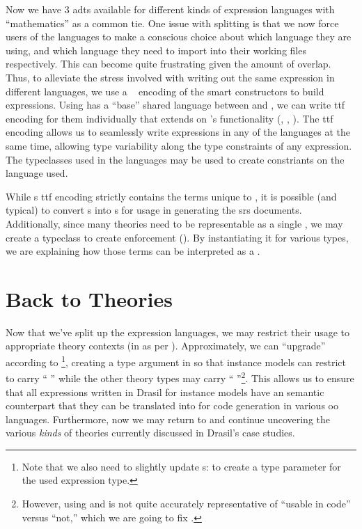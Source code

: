 Now we have 3 \acsp{adt} available for different kinds of expression languages
with ``mathematics'' as a common tie. One issue with splitting is that we now
force users of the languages to make a conscious choice about which language
they are using, and which language they need to import into their working files
respectively. This can become quite frustrating given the amount of overlap.
Thus, to alleviate the stress involved with writing out the same expression in
different languages, we use a ~\cite{Carette2009} encoding of the smart
constructors to build expressions. Using \Expr{} has a ``base'' shared language
between \ModelExpr{} and \CodeExpr{}, we can write \acs{ttf} encoding for them
individually that extends on \Expr{}'s functionality
(, ,
). The \acs{ttf} encoding allows us to seamlessly
write expressions in any of the languages at the same time, allowing type
variability along the type constraints of any expression. The typeclasses used
in the languages may be used to create constriants on the language used.

While \ModelExpr{}s \acs{ttf} encoding strictly contains the terms unique to
\ModelExpr{}, it is possible (and typical) to convert \Expr{}s into
\ModelExpr{}s for usage in generating the \acs{srs} documents. Additionally,
since many theories need to be representable as a single \Relation{}, we may
create a typeclass to create enforcement (). By
instantiating it for various types, we are explaining how those terms can be
interpreted as a \ModelExpr{}.

\currentExpressHaskell{}
 
\section{Back to Theories}
\label{chap:lang-division:sec:back-to-theories}

Now that we've split up the expression languages, we may restrict their usage to
appropriate theory contexts (in \ModelKinds{} as per ).
Approximately, we can ``upgrade'' \ModelKinds{} according to
\footnote{Note that we also need to slightly
update \QDefinition{}s:  to create a type
parameter for the used expression type.}, creating a type argument in
\ModelKinds{} so that instance models can restrict to carry ``\ModelKinds{}
\Expr{}'' while the other theory types may carry ``\ModelKinds{}
\ModelExpr{}''\footnote{However, using \Expr{} and \ModelExpr{} is not quite
accurately representative of ``usable in code'' versus ``not,'' which we are
going to fix \cite{DrasilIssue2853AlternativeModelKinds}.}. This allows us to
ensure that all expressions written in Drasil for instance models have an
semantic counterpart that they can be translated into for code generation in
various \acs{oo} languages. Furthermore, now we may return to \ModelKinds{} and
continue uncovering the various \textit{kinds} of theories currently discussed
in Drasil's case studies.

\pseudoPartialModelKindsUpgrade{}
